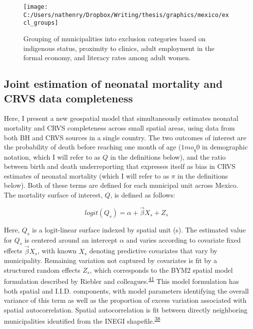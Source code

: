 \documentclass[
]{article}
\begin{document}
\begin{figure}[!ht]

{\centering \texttt{[image: C:/Users/nathenry/Dropbox/Writing/thesis/graphics/mexico/excl\_groups]} 

}

\caption{Grouping of municipalities into exclusion categories based on indigenous status, proximity to clinics, adult employment in the formal economy, and literacy rates among adult women.}\label{fig:excl-groups}
\end{figure}

\hypertarget{joint-estimation-of-neonatal-mortality-and-crvs-data-completeness}{%
\subsection{Joint estimation of neonatal mortality and CRVS data completeness}\label{joint-estimation-of-neonatal-mortality-and-crvs-data-completeness}}

Here, I present a new geospatial model that simultaneously estimates neonatal mortality and CRVS completeness across small spatial areas, using data from both BH and CRVS sources in a single country. The two outcomes of interest are the probability of death before reaching one month of age (\(1mo_q0\) in demographic notation, which I will refer to as \(Q\) in the definitions below), and the ratio between birth and death underreporting that expresses itself as bias in CRVS estimates of neonatal mortality (which I will refer to as \(\pi\) in the definitions below). Both of these terms are defined for each municipal unit across Mexico. The mortality surface of interest, \(Q\), is defined as follows:

\[logit(Q_s) = \alpha + \overrightarrow{\beta}X_s + Z_s\]

Here, \(Q_s\) is a logit-linear surface indexed by spatial unit (s). The estimated value for \(Q_s\) is centered around an intercept \(\alpha\) and varies according to covariate fixed effects \(\overrightarrow{\beta}X_s\), with known \(X_s\) denoting predictive covariates that vary by municipality. Remaining variation not captured by covariates is fit by a structured random effects \(Z_s\), which corresponds to the BYM2 spatial model formulation described by Riebler and colleagues.\textsuperscript{\protect\hyperlink{ref-Riebler2016}{41}} This model formulation has both spatial and I.I.D. components, with model parameters identifying the overall variance of this term as well as the proportion of excess variation associated with spatial autocorrelation. Spatial autocorrelation is fit between directly neighboring municipalities identified from the INEGI shapefile.\textsuperscript{\protect\hyperlink{ref-INEGI2010b}{38}}
\end{document}
